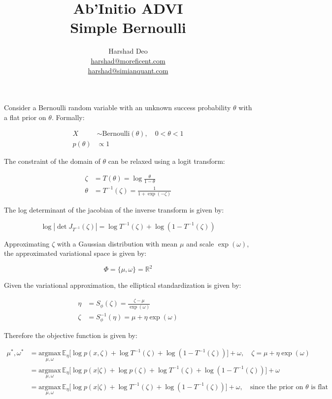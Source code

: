 \documentclass[10pt]{article}
\title{Ab'Initio ADVI \\ Simple Bernoulli}
\author{Harshad Deo \\ 
  \href{mailto:harshad@moreficent.com}{harshad@moreficent.com} \\ 
  \href{mailto:harshad@simianquant.com}{harshad@simianquant.com}
}
\date{}
\begin{document}
  
\maketitle

Consider a Bernoulli random variable with an unknown success probability $\theta$ with a flat prior on $\theta$. Formally:

\begin{align*}
  X &\sim \text{Bernoulli}(\theta), \quad 0 < \theta <1\\
  p(\theta) &\varpropto 1
\end{align*}

The constraint of the domain of $\theta$ can be relaxed using a logit transform:

\begin{align*}
  \zeta &= T(\theta) = \log \frac{\theta}{1 - \theta} \\
  \theta &= T^{-1}(\zeta) = \frac{1}{1 + \exp(-\zeta)}
\end{align*}

The log determinant of the jacobian of the inverse transform is given by:

\begin{equation*}
  \log|\det J_{T^{-1}}(\zeta)| = \log T^{-1}(\zeta) + \log(1 - T^{-1}(\zeta))
\end{equation*}


Approximating $\zeta$ with a Gaussian distribution with mean $\mu$ and scale $\exp(\omega)$, the approximated 
variational space is given by:

\begin{equation*}
  \Phi = \{\mu, \omega\} = \mathbb{R}^2
\end{equation*}

Given the variational approximation, the elliptical standardization is given by:

\begin{align*}
  \eta &= S_{\phi}(\zeta) = \frac{\zeta - \mu}{\exp(\omega)} \\
  \zeta &= S_{\phi}^{-1}(\eta) = \mu + \eta \exp(\omega)
\end{align*}

Therefore the objective function is given by:

\begin{align*}
  \mu^*, \omega^* &= \underset{\mu, \omega}{\text{argmax}}\,\mathbb{E}_\eta\big[\log p(x, \zeta) + \log T^{-1}(\zeta) + \log(1 - T^{-1}(\zeta)) \big] + \omega, \quad \zeta = \mu + \eta\exp(\omega) \\
  &= \underset{\mu, \omega}{\text{argmax}}\,\mathbb{E}_\eta\big[\log p(x | \zeta) + \log p(\zeta) + \log T^{-1}(\zeta) + \log(1 - T^{-1}(\zeta))] + \omega \\
  &= \underset{\mu, \omega}{\text{argmax}}\,\mathbb{E}_\eta\big[\log p(x | \zeta) + \log T^{-1}(\zeta) + \log(1 - T^{-1}(\zeta))] + \omega, \quad \text{since the prior on $\theta$ is flat}
\end{align*}
\end{document}
